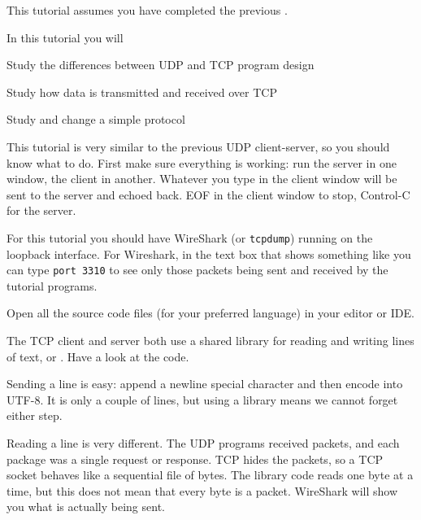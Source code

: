







\begin{itshape}
This tutorial assumes you have completed the previous .
\end{itshape}



In this tutorial you will

\DOT Study the differences between UDP and TCP program design

\DOT Study how data is transmitted and received over TCP

\DOT Study and change a simple protocol


This tutorial is very similar to the previous UDP client-server, so you should
know what to do. First make sure everything is
working: run the server in one window, the client in another. Whatever
you type in the client window will be sent to the server and echoed back. EOF
in the client window to stop, Control-C for the server.

For this tutorial you should have WireShark (or \texttt{tcpdump}) running
on the loopback interface. For Wireshark, in the text box that shows something
like  you can type \texttt{port 3310}
to see only those packets being sent and received by the tutorial programs.



Open all the source code files (for your preferred language) in your editor
or IDE.

The TCP client and server both use a shared library for reading and writing
lines of text,  or . Have a look at the
code.

Sending a line is easy: append a newline special character and then encode
into UTF-8. It is only a couple of lines, but using a library means we cannot
forget either step.

Reading a line is very different. The UDP programs received packets, and each
package was a single request or response. TCP hides the packets, so a TCP
socket behaves like a sequential file of bytes. The library code reads one
byte at a time, but this does not mean that every byte is a packet. WireShark
will show you what is actually being sent.

